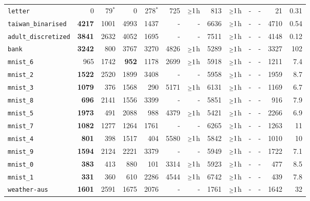 \begin{tabular}{lrrrrrrrrrrrr}
\texttt{letter} & 0 & 79$^*$ & 0 & 278$^*$ & 725 & $\mathsmaller{\geq}1$h & 813 & $\mathsmaller{\geq}1$h & - & - & 21 & 0.31\\
\texttt{taiwan\_binarised} & \textbf{4217} & 1001 & 4993 & 1437 & - & - & 6636 & $\mathsmaller{\geq}1$h & - & - & 4710 & 0.54\\
\texttt{adult\_discretized} & \textbf{3841} & 2632 & 4052 & 1695 & - & - & 7511 & $\mathsmaller{\geq}1$h & - & - & 4148 & 0.12\\
\texttt{bank} & \textbf{3242} & 800 & 3767 & 3270 & 4826 & $\mathsmaller{\geq}1$h & 5289 & $\mathsmaller{\geq}1$h & - & - & 3327 & 102\\
\texttt{mnist\_6} & 965 & 1742 & \textbf{952} & 1178 & 2699 & $\mathsmaller{\geq}1$h & 5918 & $\mathsmaller{\geq}1$h & - & - & 1211 & 7.4\\
\texttt{mnist\_2} & \textbf{1522} & 2520 & 1899 & 3408 & - & - & 5958 & $\mathsmaller{\geq}1$h & - & - & 1959 & 8.7\\
\texttt{mnist\_3} & \textbf{1079} & 376 & 1568 & 290 & 5171 & $\mathsmaller{\geq}1$h & 6131 & $\mathsmaller{\geq}1$h & - & - & 1169 & 6.7\\
\texttt{mnist\_8} & \textbf{696} & 2141 & 1556 & 3399 & - & - & 5851 & $\mathsmaller{\geq}1$h & - & - & 916 & 7.9\\
\texttt{mnist\_5} & \textbf{1973} & 491 & 2088 & 988 & 4379 & $\mathsmaller{\geq}1$h & 5421 & $\mathsmaller{\geq}1$h & - & - & 2266 & 6.9\\
\texttt{mnist\_7} & \textbf{1082} & 1277 & 1264 & 1761 & - & - & 6265 & $\mathsmaller{\geq}1$h & - & - & 1263 & 11\\
\texttt{mnist\_4} & \textbf{801} & 398 & 1517 & 404 & 5580 & $\mathsmaller{\geq}1$h & 5842 & $\mathsmaller{\geq}1$h & - & - & 1010 & 10\\
\texttt{mnist\_9} & \textbf{1594} & 2124 & 2221 & 3379 & - & - & 5949 & $\mathsmaller{\geq}1$h & - & - & 1722 & 7.1\\
\texttt{mnist\_0} & \textbf{383} & 413 & 880 & 101 & 3314 & $\mathsmaller{\geq}1$h & 5923 & $\mathsmaller{\geq}1$h & - & - & 477 & 8.5\\
\texttt{mnist\_1} & \textbf{331} & 360 & 610 & 2286 & 4544 & $\mathsmaller{\geq}1$h & 6742 & $\mathsmaller{\geq}1$h & - & - & 439 & 7.8\\
\texttt{weather-aus} & \textbf{1601} & 2591 & 1675 & 2076 & - & - & 1761 & $\mathsmaller{\geq}1$h & - & - & 1642 & 32\\
\bottomrule
\end{tabular}
